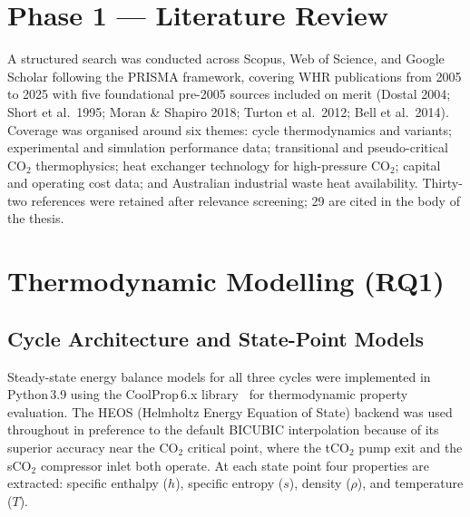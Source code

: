 \documentclass[12pt,a4paper]{report}
\begin{document}
\section{Phase 1 --- Literature Review}
\label{sec:method_lit}

A structured search was conducted across Scopus, Web of Science, and Google
Scholar following the PRISMA framework, covering WHR publications from 2005
to 2025 with five foundational pre-2005 sources included on merit (Dostal
2004; Short et al.\ 1995; Moran \& Shapiro 2018; Turton et al.\ 2012; Bell
et al.\ 2014). Coverage was organised around six themes: cycle thermodynamics
and variants; experimental and simulation performance data; transitional and
pseudo-critical CO$_2$ thermophysics; heat exchanger technology for
high-pressure CO$_2$; capital and operating cost data; and Australian
industrial waste heat availability. Thirty-two references were retained after
relevance screening; 29 are cited in the body of the thesis.

\section{Thermodynamic Modelling (RQ1)}
\label{sec:method_thermo}

\subsection{Cycle Architecture and State-Point Models}

Steady-state energy balance models for all three cycles were implemented in
Python\,3.9 using the CoolProp\,6.x library~\cite{Bell2014} for
thermodynamic property evaluation. The HEOS (Helmholtz Energy Equation of
State) backend was used throughout in preference to the default BICUBIC
interpolation because of its superior accuracy near the CO$_2$ critical
point, where the tCO$_2$ pump exit and the sCO$_2$ compressor inlet both
operate. At each state point four properties are extracted: specific enthalpy
($h$), specific entropy ($s$), density ($\rho$), and temperature ($T$).
\end{document}
